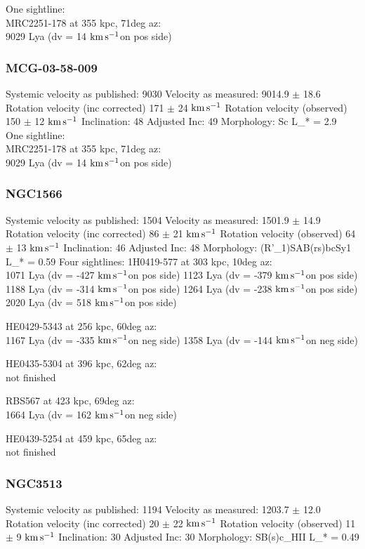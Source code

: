 \documentclass[iop]{emulateapj-rtx4}
\newcommand{\kms}{$\rm km\, s^{-1}$}
\begin{document}
One sightline: \\
MRC2251-178 at 355 kpc, 71deg az: \\
9029 Lya (dv = 14 \kms on pos side)


\subsubsection{MCG-03-58-009}
Systemic velocity as published: 9030
Velocity as measured: 9014.9 $\pm$ 18.6
Rotation velocity (inc corrected) 171 $\pm$ 24 \kms
Rotation velocity (observed) 150 $\pm$ 12 \kms
Inclination: 48
Adjusted Inc: 49
Morphology: Sc
L_{\**} = 2.9 \\

One sightline: \\
MRC2251-178 at 355 kpc, 71deg az: \\
9029 Lya (dv = 14 \kms on pos side)




\subsubsection{NGC1566}
Systemic velocity as published: 1504
Velocity as measured: 1501.9 $\pm$ 14.9
Rotation velocity (inc corrected) 86 $\pm$ 21 \kms
Rotation velocity (observed) 64 $\pm$ 13 \kms
Inclination: 46
Adjusted Inc: 48
Morphology: (R'_1)SAB(rs)bcSy1
L_{\**} = 0.59
Four sightlines: 
1H0419-577 at 303 kpc, 10deg az: \\
1071 Lya (dv = -427 \kms on pos side)
1123 Lya (dv = -379 \kms on pos side)
1188 Lya (dv = -314 \kms on pos side)
1264 Lya (dv = -238 \kms on pos side)
2020 Lya (dv = 518 \kms on pos side)

HE0429-5343 at 256 kpc, 60deg az: \\
1167 Lya (dv = -335 \kms on neg side)
1358 Lya (dv = -144 \kms on neg side)

HE0435-5304 at 396 kpc, 62deg az: \\
not finished

RBS567 at 423 kpc, 69deg az: \\
1664 Lya (dv = 162 \kms on neg side)

HE0439-5254 at 459 kpc, 65deg az: \\
not finished



\subsubsection{NGC3513}
Systemic velocity as published: 1194
Velocity as measured: 1203.7 $\pm$ 12.0
Rotation velocity (inc corrected) 20 $\pm$ 22 \kms
Rotation velocity (observed) 11 $\pm$ 9 \kms
Inclination: 30
Adjusted Inc: 30
Morphology: SB(s)c_HII
L_{\**} = 0.49 \\
\end{document}
